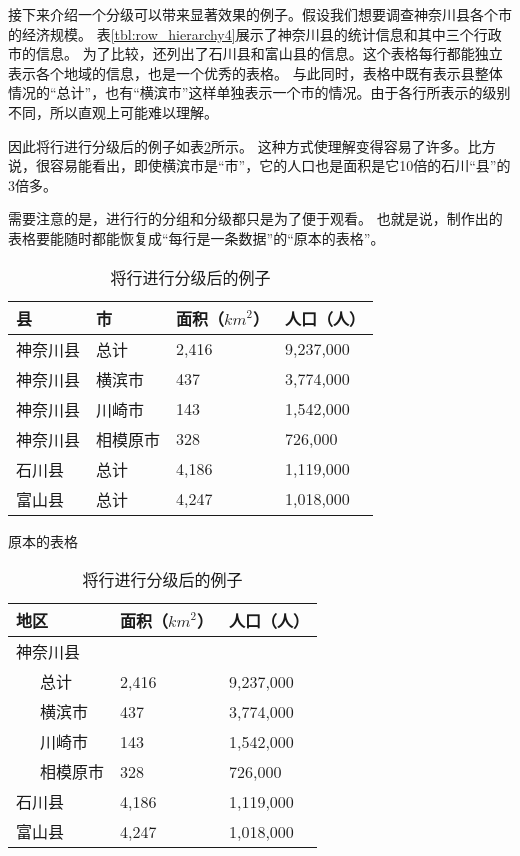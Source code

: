 \documentclass{article}
\newcommand{\Tref}[1]{表\ref{#1}}
\begin{document}
\newpage
接下来介绍一个分级可以带来显著效果的例子。假设我们想要调查神奈川县各个市的经济规模。
\Tref{tbl:row_hierarchy4}展示了神奈川县的统计信息和其中三个行政市的信息。
为了比较，还列出了石川县和富山县的信息。这个表格每行都能独立表示各个地域的信息，也是一个优秀的表格。
与此同时，表格中既有表示县整体情况的“总计”，也有“横滨市”这样单独表示一个市的情况。由于各行所表示的级别不同，所以直观上可能难以理解。

因此将行进行分级后的例子如\Tref{tbl:row_hierarchy5}所示。
这种方式使理解变得容易了许多。比方说，很容易能看出，即使横滨市是“市”，它的人口也是面积是它10倍的石川“县”的3倍多。

需要注意的是，进行行的分组和分级都只是为了便于观看。
也就是说，制作出的表格要能随时都能恢复成“每行是一条数据”的“原本的表格”。


\begin{table}[h]
    \begin{minipage}[t]{0.48\linewidth}
        \centering
        \begin{tabular}{@{}llll@{}} \toprule
            县 & 市 & 面积（${km}^2$） & 人口（人） \\ \midrule
            神奈川县 & 总计 & 2,416 & 9,237,000 \\
            神奈川县 & 横滨市 & 437 & 3,774,000 \\
            神奈川县 & 川崎市 & 143 & 1,542,000 \\
            神奈川县 & 相模原市 & 328 & 726,000 \\
            石川县   & 总计 & 4,186 & 1,119,000 \\
            富山县   & 总计 & 4,247 & 1,018,000 \\ \bottomrule   
        \end{tabular}
        \caption{原本的表格}
        \label{tbl:row_hierarchy4}
    \end{minipage}
    \hfill
    \begin{minipage}[t]{0.48\linewidth}
        \centering
        \begin{tabular}{@{}lll@{}} \toprule
            地区 & 面积（${km}^2$） & 人口（人） \\ \midrule
            神奈川县 & & \\
            ~~~总计  & 2,416 & 9,237,000 \\
            ~~~横滨市 & 437 & 3,774,000 \\
            ~~~川崎市 & 143 & 1,542,000 \\
            ~~~相模原市 & 328 & 726,000 \\
            石川县   & 4,186 & 1,119,000 \\
            富山县   & 4,247 & 1,018,000 \\ \bottomrule   
        \end{tabular}
        \caption{将行进行分级后的例子}
        \label{tbl:row_hierarchy5}
    \end{minipage}
\end{table}
\end{document}
